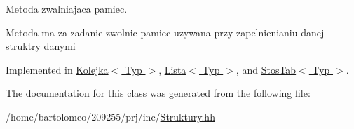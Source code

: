 Metoda zwalniajaca pamiec. 

Metoda ma za zadanie zwolnic pamiec uzywana przy zapelnienianiu danej struktry danymi 

Implemented in \hyperlink{class_kolejka_a607af93211b5e5e31123c633e1f1fcf2}{Kolejka$<$ Typ $>$}, \hyperlink{class_lista_a3ff3e2f58bd3b1d1b11f9ad68948a321}{Lista$<$ Typ $>$}, and \hyperlink{class_stos_tab_aec0cb259c6f044fa7d3b367dc1baca5c}{Stos\-Tab$<$ Typ $>$}.



The documentation for this class was generated from the following file\-:\begin{DoxyCompactItemize}
\item 
/home/bartolomeo/209255/prj/inc/\hyperlink{_struktury_8hh}{Struktury.\-hh}\end{DoxyCompactItemize}

